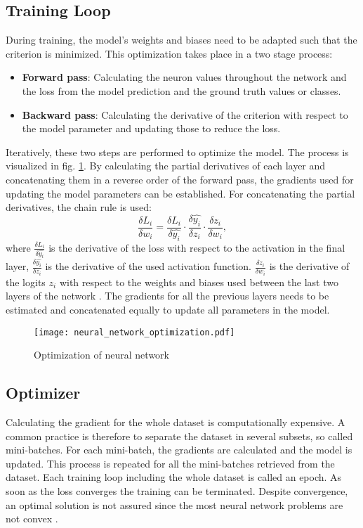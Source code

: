 \subsection{Training Loop}
During training, the model's weights and biases need to be adapted such that the criterion is minimized. This optimization takes place in a two stage process:
\begin{itemize}
    \item \textbf{Forward pass}: Calculating the neuron values throughout the network and the loss from the model prediction and the ground truth values or classes.
    \item \textbf{Backward pass}: Calculating the derivative of the criterion with respect to the model parameter and updating those to reduce the loss.
\end{itemize}
Iteratively, these two steps are performed to optimize the model. The process is visualized in fig. \ref{fig:neural_network_optimization}. By calculating the partial derivatives of each layer and concatenating them in a reverse order of the forward pass, the gradients used for updating the model parameters can be established. For concatenating the partial derivatives, the chain rule is used:
\begin{equation}
 \frac{\delta L_{i}}{\delta w_{i}} = \frac{\delta L_{i}}{\delta \hat{y_{i}}} \cdot \frac{\delta \hat{y_{i}}}{\delta z_{i}} \cdot \frac{\delta z_{i}}{\delta w_{i}}, 
 \label{chain_rule}
\end{equation}
where $\frac{\delta L_{i}}{\delta \hat{y_{i}}}$ is the derivative of the loss with respect to the activation in the final layer, $\frac{\delta \hat{y_{i}}}{\delta z_{i}}$ is the derivative of the used activation function.  $\frac{\delta z_{i}}{\delta w_{i}}$ is the derivative of the logits $z_{i}$ with respect to the weights and biases used between the last two layers of the network \cite{ShilohPerl2020}. The gradients for all the previous layers needs to be estimated and concatenated equally to update all parameters in the model.

\begin{figure}[H]
  \centering
  \texttt{[image: neural\_network\_optimization.pdf]}
  \caption {Optimization of neural network}
  \label{fig:neural_network_optimization}
\end{figure}

\subsection{Optimizer}
Calculating the gradient for the whole dataset is computationally expensive. A common practice is therefore to separate the dataset in several subsets, so called mini-batches. For each mini-batch, the gradients are calculated and the model is updated. This process is repeated for all the mini-batches retrieved from the dataset. Each training loop including the whole dataset is called an epoch. As soon as the loss converges the training can be terminated. Despite convergence, an optimal solution is not assured since the most neural network problems are not convex \cite{ShilohPerl2020}.

